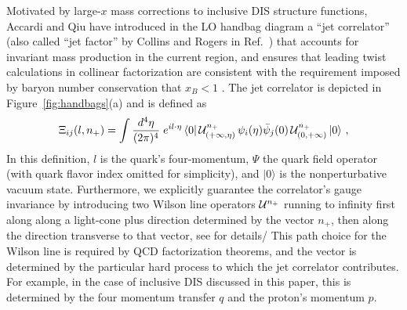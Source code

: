 \documentclass[preprintnumbers,floatfix,nofootinbib]{revtex4}
\newcommand{\de}{d}                    %
\begin{document}
Motivated by large-$x$ mass corrections to inclusive DIS structure functions,
Accardi and Qiu \cite{Accardi:2008ne} have introduced in the LO handbag diagram 
a ``jet correlator'' (also called ``jet factor'' by Collins and Rogers in Ref.~\cite{Collins:2007ph})
that accounts for invariant mass production in the current region, and ensures
that leading twist calculations in collinear factorization are consistent with
the requirement imposed by baryon number conservation that $x_B<1$
\cite{Accardi:2008ne}. The jet correlator is depicted in
Figure~\ref{fig:handbags}(a) and is defined as 
\begin{align}
\Xi_{ij}(l,n_+) =\int
  \frac{\de^4\eta}{(2\pi)^4}\; e^{i l \cdot \eta}\,
    \langle 0|\, {\cal U}^{n_+}_{(+\infty,\eta)}
\,\psi_i(\eta)
             \bar{\psi}_j(0)\,
{\cal U}^{n_+}_{(0,+\infty)}\,   |0 \rangle \ ,
\label{e:xifull}
\end{align} 
In this definition, $l$ is the quark's four-momentum, $\Psi$ the quark field
operator (with quark flavor index omitted for simplicity), and $|0\rangle$ is
the nonperturbative vacuum state. Furthermore, we explicitly guarantee the
correlator's gauge invariance by introducing two Wilson line operators ${\cal
  U}^{n_+}$ running to infinity first along along a light-cone plus direction determined by the vector $n_+$, then along the direction transverse to that vector, see \cite{Bacchetta:2006tn} for details/ This path choice for the Wilson line is required by QCD factorization theorems, and the vector is determined by the particular hard process to which the jet correlator contributes. For example, in the case of inclusive DIS
discussed in this paper, this is determined by the four momentum transfer $q$
and the proton's momentum $p$. 
\end{document}
